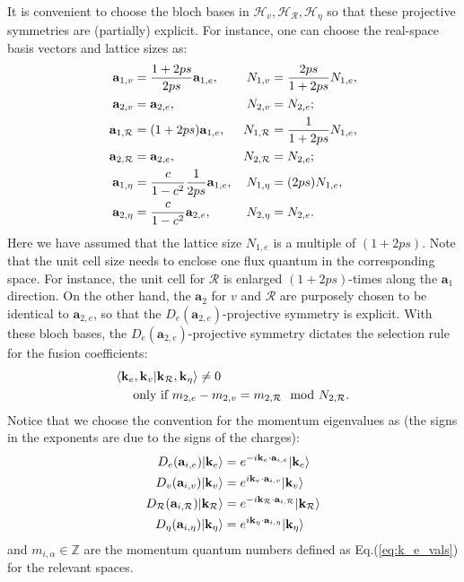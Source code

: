 It is convenient to choose the bloch bases in $\mathcal H_v,\mathcal H_{\mathcal R}, \mathcal H_{\eta}$ so that these projective symmetries are (partially) explicit. For instance, one can choose the real-space basis vectors and lattice sizes as:
\begin{align}
\mathbf a_{1,v}&=\frac{1+2ps}{2ps}\mathbf a_{1,e},& N_{1,v}&=\frac{2ps}{1+2ps} N_{1,e},\notag\\
\mathbf a_{2,v}&=\mathbf a_{2,e}, & N_{2,v}&=N_{2,e};\notag\\
\mathbf a_{1,\mathcal R}&=(1+2ps)\mathbf a_{1,e}, &N_{1,\mathcal R}&=\frac{1}{1+2ps} N_{1,e},\notag\\
\mathbf a_{2,\mathcal R}&=\mathbf a_{2,e}, & N_{2,\mathcal R}&=N_{2,e};\notag\\
\mathbf a_{1,\eta}&=\frac{c}{1-c^2}\frac{1}{2ps}\mathbf a_{1,e},& N_{1,\eta}&=(2ps) N_{1,e},\notag\\
\mathbf a_{2,\eta}&=\frac{c}{1-c^2} \mathbf a_{2,e}, & N_{2,\eta}&=N_{2,e}.\label{eq:bloch_bases}
\end{align}
Here we have assumed that the lattice size $N_{1,e}$ is a multiple of $(1+2ps)$. Note that the unit cell size needs to enclose one flux quantum in the corresponding space. For instance, the unit cell for $\mathcal R$ is enlarged $(1+2ps)$-times along the $\mathbf a_{1}$ direction. On the other hand, the $\mathbf a_2$ for $v$ and $\mathcal R$ are purposely chosen to be identical to $\mathbf a_{2,e}$, so that the $D_e(\mathbf a_{2,e})$-projective symmetry is explicit.  With these bloch bases, the $D_e(\mathbf a_{2,e})$-projective symmetry dictates the selection rule for the fusion coefficients: 
\begin{align}
&\langle \mathbf k_e,\mathbf k_v|\mathbf k_{\mathcal R},\mathbf k_{\eta} \rangle \neq 0 \notag\\
&\quad\text{ only if } m_{2,e}-m_{2,v}=m_{2,\mathcal R} \mod N_{2,\mathcal R}.\label{eq:CG_selection_2}
\end{align}
Notice that we choose the convention for the momentum eigenvalues as (the signs in the exponents are due to the signs of the charges):
\begin{align}
D_e(\mathbf a_{i,e})|\mathbf k_e\rangle&=e^{-i\mathbf k_e\cdot \mathbf a_{i,e}}|\mathbf k_e\rangle\notag\\
D_v(\mathbf a_{i,v})|\mathbf k_v\rangle&=e^{i\mathbf k_v\cdot \mathbf a_{i,v}}|\mathbf k_v\rangle\notag\\
D_{\mathcal R}(\mathbf a_{i,\mathcal R})|\mathbf k_{\mathcal R}\rangle&=e^{-i\mathbf k_{\mathcal R}\cdot \mathbf a_{i,\mathcal R}}|\mathbf k_{\mathcal R}\rangle\notag\\
D_{\eta}(\mathbf a_{i,\eta})|\mathbf k_{\eta}\rangle&=e^{i\mathbf k_{\eta}\cdot \mathbf a_{i,\eta}}|\mathbf k_{\eta}\rangle
\end{align}
and $m_{i,\alpha}\in \mathbb Z$ are the momentum quantum numbers defined as Eq.(\ref{eq:k_e_vals}) for the relevant spaces.

